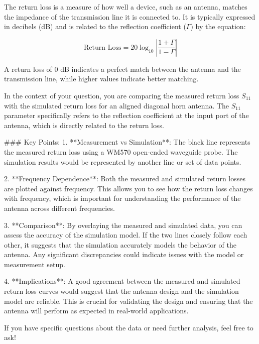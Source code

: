 The return loss is a measure of how well a device, such as an antenna, matches the impedance of the transmission line it is connected to. It is typically expressed in decibels (dB) and is related to the reflection coefficient (\(\Gamma\)) by the equation:

\[ \text{Return Loss} = 20 \log_{10} \left| \frac{1 + \Gamma}{1 - \Gamma} \right| \]

A return loss of 0 dB indicates a perfect match between the antenna and the transmission line, while higher values indicate better matching.

In the context of your question, you are comparing the measured return loss \(S_{11}\) with the simulated return loss for an aligned diagonal horn antenna. The \(S_{11}\) parameter specifically refers to the reflection coefficient at the input port of the antenna, which is directly related to the return loss.

### Key Points:
1. **Measurement vs Simulation**: The black line represents the measured return loss using a WM570 open-ended waveguide probe. The simulation results would be represented by another line or set of data points.
   
2. **Frequency Dependence**: Both the measured and simulated return losses are plotted against frequency. This allows you to see how the return loss changes with frequency, which is important for understanding the performance of the antenna across different frequencies.

3. **Comparison**: By overlaying the measured and simulated data, you can assess the accuracy of the simulation model. If the two lines closely follow each other, it suggests that the simulation accurately models the behavior of the antenna. Any significant discrepancies could indicate issues with the model or measurement setup.

4. **Implications**: A good agreement between the measured and simulated return loss curves would suggest that the antenna design and the simulation model are reliable. This is crucial for validating the design and ensuring that the antenna will perform as expected in real-world applications.

If you have specific questions about the data or need further analysis, feel free to ask!